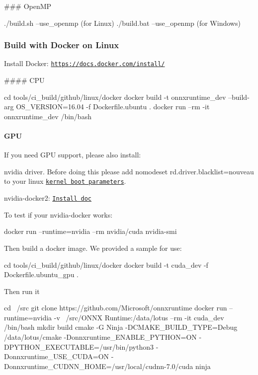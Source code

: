 \#\#\# Open\+MP 
\begin{DoxyCode}
./build.sh --use\_openmp (for Linux)
./build.bat --use\_openmp (for Windows)
\end{DoxyCode}


\subsubsection*{Build with Docker on Linux}

Install Docker\+: {\ttfamily \href{https://docs.docker.com/install/}{\tt https\+://docs.\+docker.\+com/install/}}

\#\#\#\# C\+PU 
\begin{DoxyCode}
cd tools/ci\_build/github/linux/docker
docker build -t onnxruntime\_dev --build-arg OS\_VERSION=16.04 -f Dockerfile.ubuntu .
docker run --rm -it onnxruntime\_dev /bin/bash
\end{DoxyCode}


\paragraph*{G\+PU}

If you need G\+PU support, please also install\+:
\begin{DoxyEnumerate}
\item nvidia driver. Before doing this please add \textquotesingle{}nomodeset rd.\+driver.\+blacklist=nouveau\textquotesingle{} to your linux \href{https://www.kernel.org/doc/html/v4.17/admin-guide/kernel-parameters.html}{\tt kernel boot parameters}.
\item nvidia-\/docker2\+: \href{`https://github.com/NVIDIA/nvidia-docker/wiki/Installation-(version-2.0)`}{\tt Install doc}
\end{DoxyEnumerate}

To test if your nvidia-\/docker works\+: 
\begin{DoxyCode}
docker run --runtime=nvidia --rm nvidia/cuda nvidia-smi
\end{DoxyCode}


Then build a docker image. We provided a sample for use\+: 
\begin{DoxyCode}
cd tools/ci\_build/github/linux/docker
docker build -t cuda\_dev -f Dockerfile.ubuntu\_gpu .
\end{DoxyCode}


Then run it 
\begin{DoxyCode}
cd ~/src
git clone https://github.com/Microsoft/onnxruntime
docker run --runtime=nvidia -v ~/src/ONNX Runtime:/data/lotus --rm -it cuda\_dev /bin/bash
mkdir build
cmake -G Ninja -DCMAKE\_BUILD\_TYPE=Debug /data/lotus/cmake -Donnxruntime\_ENABLE\_PYTHON=ON
       -DPYTHON\_EXECUTABLE=/usr/bin/python3 -Donnxruntime\_USE\_CUDA=ON -Donnxruntime\_CUDNN\_HOME=/usr/local/cudnn-7.0/cuda
ninja
\end{DoxyCode}
 